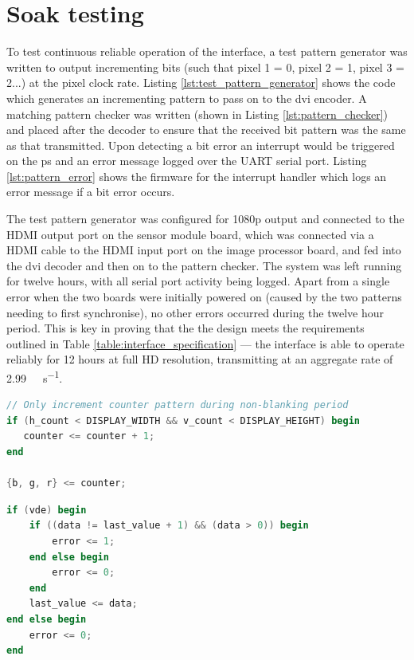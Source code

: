\section{Soak testing}
To test continuous reliable operation of the interface, a test pattern generator was written to output incrementing bits (such that pixel 1 = 0, pixel 2 = 1, pixel 3 = 2...) at the pixel clock rate. Listing \ref{lst:test_pattern_generator} shows the code which generates an incrementing pattern to pass on to the \gls{dvi} encoder. A matching pattern checker was written (shown in Listing \ref{lst:pattern_checker}) and placed after the decoder to ensure that the received bit pattern was the same as that transmitted. Upon detecting a bit error an interrupt would be triggered on the \gls{ps} and an error message logged over the UART serial port. Listing \ref{lst:pattern_error} shows the firmware for the interrupt handler which logs an error message if a bit error occurs.

The test pattern generator was configured for 1080p output and connected to the HDMI output port on the sensor module board, which was connected via a HDMI cable to the HDMI input port on the image processor board, and fed into the \gls{dvi} decoder and then on to the pattern checker. The system was left running for twelve hours, with all serial port activity being logged. Apart from a single error when the two boards were initially powered on (caused by the two patterns needing to first synchronise), no other errors occurred during the twelve hour period. This is key in proving that the the design meets the requirements outlined in Table \ref{table:interface_specification} --- the interface is able to operate reliably for 12 hours at full HD resolution, transmitting at an aggregate rate of \SI{2.99}{\giga\bit\per\second}.

\begin{lstlisting}[caption={Test pattern generator outputs an incrementing bit pattern.}, label={lst:test_pattern_generator}, language=Verilog]
// Only increment counter pattern during non-blanking period
if (h_count < DISPLAY_WIDTH && v_count < DISPLAY_HEIGHT) begin
   counter <= counter + 1;
end

{b, g, r} <= counter;
\end{lstlisting}

\begin{lstlisting}[caption={Test pattern checker ensures the received bit stream is the same as that sent.}, label={lst:pattern_checker}, language=Verilog]
if (vde) begin
    if ((data != last_value + 1) && (data > 0)) begin
        error <= 1;
    end else begin
        error <= 0;
    end
    last_value <= data;
end else begin
    error <= 0;
end
\end{lstlisting}

